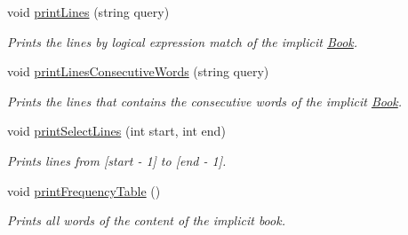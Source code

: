 \begin{DoxyCompactItemize}
void \hyperlink{class_book_a0c019a8318999229bf506f7f64e67a85}{print\+Lines} (string query)
\begin{DoxyCompactList}\small\item\em Prints the lines by logical expression match of the implicit \hyperlink{class_book}{Book}. \end{DoxyCompactList}\item 
void \hyperlink{class_book_ad72be3b32007023b6bb41f12276e81a3}{print\+Lines\+Consecutive\+Words} (string query)
\begin{DoxyCompactList}\small\item\em Prints the lines that contains the consecutive words of the implicit \hyperlink{class_book}{Book}. \end{DoxyCompactList}\item 
void \hyperlink{class_book_a7193030998d6251851be26196762f8e6}{print\+Select\+Lines} (int start, int end)
\begin{DoxyCompactList}\small\item\em Prints lines from \mbox{[}start -\/ 1\mbox{]} to \mbox{[}end -\/ 1\mbox{]}. \end{DoxyCompactList}\item 
void \hyperlink{class_book_ac8b57c6a725ae9afeb24e6e74d4f8fd0}{print\+Frequency\+Table} ()
\begin{DoxyCompactList}\small\item\em Prints all words of the content of the implicit book. \end{DoxyCompactList}\end{DoxyCompactItemize}
